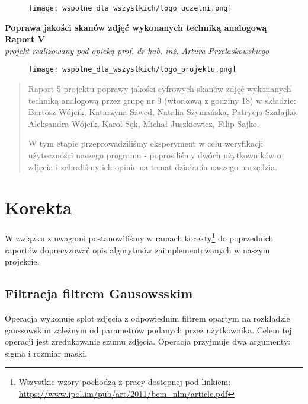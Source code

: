 \documentclass[]{mwart}
\begin{document}
\thispagestyle{empty}

\begin{figure}[h]
    \centering
    \texttt{[image: wspolne\_dla\_wszystkich/logo\_uczelni.png]}
\end{figure}


\begin{center}
    {\LARGE \textbf{Poprawa jakości skanów zdjęć wykonanych techniką analogową
        }} \\[0.3cm]
    {\large \textbf{Raport V}} \\[0.2cm]
    \textit{projekt realizowany pod opieką prof. dr hab. inż. Artura Przelaskowskiego}

\end{center}

\begin{figure}[h]
    \centering
    \texttt{[image: wspolne\_dla\_wszystkich/logo\_projektu.png]}
\end{figure}

\vfill
\begin{abstract}
    Raport 5 projektu poprawy jakości cyfrowych skanów zdjęć wykonanych techniką analogową przez grupę nr 9 (wtorkową z godziny 18)
    w składzie:  Bartosz Wójcik, Katarzyna Szwed, Natalia Szymańska,
    Patrycja Szałajko, Aleksandra Wójcik, Karol Sęk, Michał Juszkiewicz, Filip Sajko.

    W tym etapie przeprowadziliśmy eksperyment w celu weryfikacji użyteczności naszego programu - poprosiliśmy dwóch użytkowników o zdjęcia i zebraliśmy ich opinie na temat działania naszego narzędzia.
\end{abstract}

\newpage
\tableofcontents{}

\newpage


\section{Korekta}
W związku z uwagami postanowiliśmy w ramach korekty\footnote{Wszystkie wzory pochodzą z pracy dostępnej pod linkiem: \url{https://www.ipol.im/pub/art/2011/bcm_nlm/article.pdf} } do poprzednich raportów doprecyzować opis algorytmów zaimplementowanych w naszym projekcie.


\subsection{Filtracja filtrem Gausowsskim}
Operacja wykonuje splot zdjęcia z odpowiednim filtrem opartym na rozkładzie gaussowskim
zależnym od parametrów podanych przez użytkownika. Celem tej operacji jest zredukowanie
szumu zdjęcia.
Operacja przyjmuje dwa argumenty: sigma i rozmiar maski. \newline
\end{document}

